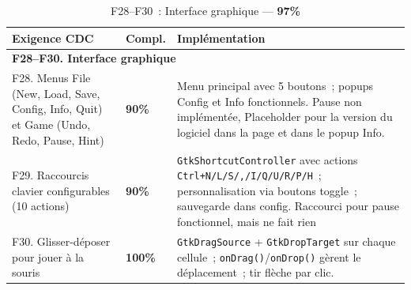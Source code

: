 \documentclass[a4paper]{article}
\begin{document}
 
\begin{table}[H]
\centering
\renewcommand{\arraystretch}{1.4}
\begin{tabular}{|p{6cm}|p{1.5cm}|p{8cm}|}
\hline
\textbf{Exigence CDC} & \textbf{Compl.} & \textbf{Implémentation} \\
\hline
\multicolumn{3}{|l|}{\textbf{F28--F30. Interface graphique}} \\
\hline
F28. Menus File (New, Load, Save, Config, Info, Quit) et Game (Undo, Redo, Pause, Hint)
& \textbf{90\%}
& Menu principal avec 5 boutons~; popups Config et Info fonctionnels. Pause non implémentée, Placeholder pour la version du logiciel dans la page et dans le popup Info. \\
\hline
F29. Raccourcis clavier configurables (10 actions)
& \textbf{90\%}
& \texttt{GtkShortcutController} avec actions \texttt{Ctrl+N/L/S/,/I/Q/U/R/P/H}~; personnalisation via boutons toggle~; sauvegarde dans config. Raccourci pour pause fonctionnel, mais ne fait rien \\
\hline
F30. Glisser-déposer pour jouer à la souris
& \textbf{100\%}
& \texttt{GtkDragSource} + \texttt{GtkDropTarget} sur chaque cellule~; \texttt{onDrag()}/\texttt{onDrop()} gèrent le déplacement~; tir flèche par clic. \\
\hline
\end{tabular}
\caption{F28--F30~: Interface graphique --- \textbf{97\%}}
\label{tab:f28-f30}
\end{table}
 
 
\end{document}
